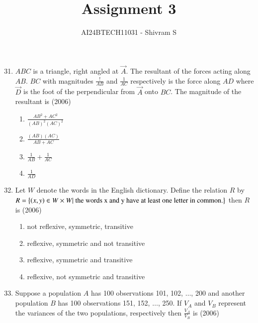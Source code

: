 \documentclass[journal]{IEEEtran}
\begin{document}

\onecolumn

\title{Assignment 3}
\author{AI24BTECH11031 - Shivram S}
\maketitle
\bigskip

\renewcommand{\thefigure}{\theenumi}
\renewcommand{\thetable}{\theenumi}

\begin{enumerate}
    \setcounter{enumi}{30}
    \item $ABC$ is a triangle, right angled at $\vec A$. The resultant of
        the forces acting along $AB$. $BC$ with magnitudes $\frac {!} {AB}$
        and $\frac {1} {AC}$ respectively is the force along $AD$ where
        $\vec D$ is the foot of the perpendicular from $\vec A$ onto $BC$.
        The magnitude of the resultant is
        \hfill (2006)

        \begin{multicols}{2}
            \begin{enumerate}
                \item $\frac {AB^2 + AC^2} {(AB)^2(AC)^2}$
                \item $\frac {(AB)(AC)} {AB + AC}$
                \item $\frac {1} {AB} + \frac {1} {AC}$
                \item $ \frac {1} {AD}$
            \end{enumerate}
        \end{multicols}

    \item Let $W$ denote the words in the English dictionary. Define the
        relation $R$ by $R = \left\{\left(x, y\right) \in W \times W \vert
        \text{ the words x and y have at least one letter in common.}\right\}$
        then $R$ is
        \hfill (2006)

        \begin{enumerate}
            \item not reflexive, symmetric, transitive
            \item reflexive, symmetric and not transitive
            \item reflexive, symmetric and transitive
            \item reflexive, not symmetric and transitive
        \end{enumerate}

    \item Suppose a population $A$ has 100 observations 101, 102, $\dots$, 200
        and another population $B$ has 100 observations 151, 152, $\dots$, 250.
        If $V_A$ and $V_B$ represent the variances of the two populations,
        respectively then $\frac {V_A} {V_B}$ is
        \hfill (2006)


\end{enumerate}
\end{document}
